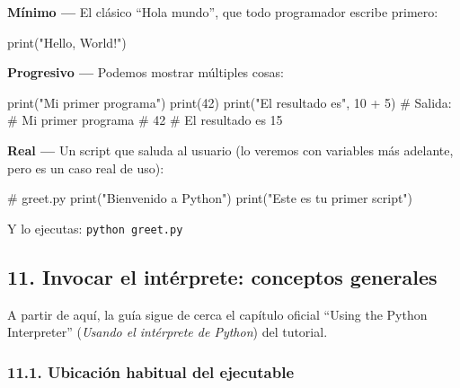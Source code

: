 \documentclass[
  doc,
  floatsintext,
  longtable,
  a4paper,
  nolmodern,
  notxfonts,
  notimes,
  12pt,
  colorlinks=true,linkcolor=blue,citecolor=blue,urlcolor=blue]{apa7}
\newenvironment{Shaded}{\begin{snugshade}}{\end{snugshade}}
\newcommand{\BuiltInTok}[1]{\textcolor[rgb]{0.00,0.23,0.31}{#1}}
\newcommand{\CommentTok}[1]{\textcolor[rgb]{0.37,0.37,0.37}{#1}}
\newcommand{\DecValTok}[1]{\textcolor[rgb]{0.68,0.00,0.00}{#1}}
\newcommand{\NormalTok}[1]{\textcolor[rgb]{0.00,0.23,0.31}{#1}}
\newcommand{\OperatorTok}[1]{\textcolor[rgb]{0.37,0.37,0.37}{#1}}
\newcommand{\StringTok}[1]{\textcolor[rgb]{0.13,0.47,0.30}{#1}}
\begin{document}
\textbf{Mínimo ---} El clásico ``Hola mundo'', que todo programador
escribe primero:

\begin{Shaded}
\begin{Highlighting}[]
\BuiltInTok{print}\NormalTok{(}\StringTok{"Hello, World!"}\NormalTok{)}
\end{Highlighting}
\end{Shaded}

\textbf{Progresivo ---} Podemos mostrar múltiples cosas:

\begin{Shaded}
\begin{Highlighting}[]
\BuiltInTok{print}\NormalTok{(}\StringTok{"Mi primer programa"}\NormalTok{)}
\BuiltInTok{print}\NormalTok{(}\DecValTok{42}\NormalTok{)}
\BuiltInTok{print}\NormalTok{(}\StringTok{"El resultado es"}\NormalTok{, }\DecValTok{10} \OperatorTok{+} \DecValTok{5}\NormalTok{)}
\CommentTok{\# Salida:}
\CommentTok{\# Mi primer programa}
\CommentTok{\# 42}
\CommentTok{\# El resultado es 15}
\end{Highlighting}
\end{Shaded}

\textbf{Real ---} Un script que saluda al usuario (lo veremos con
variables más adelante, pero es un caso real de uso):

\begin{Shaded}
\begin{Highlighting}[]
\CommentTok{\# greet.py}
\BuiltInTok{print}\NormalTok{(}\StringTok{"Bienvenido a Python"}\NormalTok{)}
\BuiltInTok{print}\NormalTok{(}\StringTok{"Este es tu primer script"}\NormalTok{)}
\end{Highlighting}
\end{Shaded}

Y lo ejecutas: \texttt{python\ greet.py}

\subsection{11. Invocar el intérprete: conceptos
generales}\label{invocar-el-intuxe9rprete-conceptos-generales}

A partir de aquí, la guía sigue de cerca el capítulo oficial ``Using the
Python Interpreter'' (\emph{Usando el intérprete de Python}) del
tutorial.

\subsubsection{11.1. Ubicación habitual del
ejecutable}\label{ubicaciuxf3n-habitual-del-ejecutable}
\end{document}
